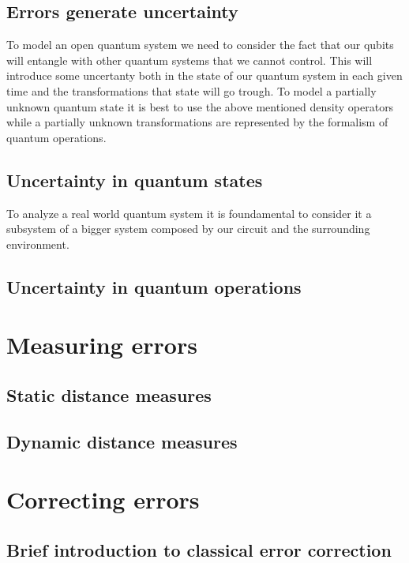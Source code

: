 \documentclass{article}
\begin{document}
\subsection{Errors generate uncertainty}

To model an open quantum system we need to consider the fact that
our qubits will entangle with other quantum systems that we cannot control.
This will introduce some uncertanty both in the state of our quantum
system in each given time and the transformations that state will go trough.
To model a partially unknown quantum state it is best to use the above mentioned
density operators while a partially unknown transformations are represented by the
formalism of quantum operations.


\subsection{Uncertainty in quantum states}

To analyze a real world quantum system it is foundamental to consider
it a subsystem of a bigger system composed by our circuit and the
surrounding environment.


\subsection{Uncertainty in quantum operations}

\section{Measuring errors}

\subsection{Static distance measures}

\subsection{Dynamic distance measures}

\section{Correcting errors}

\subsection{Brief introduction to classical error correction}
\end{document}
